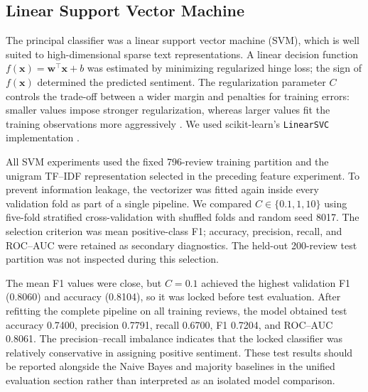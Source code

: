 \subsection{Linear Support Vector Machine}
\label{sec:linear-svm}

The principal classifier was a linear support vector machine (SVM), which is well suited to high-dimensional sparse text representations. A linear decision function $f(\mathbf{x})=\mathbf{w}^{\top}\mathbf{x}+b$ was estimated by minimizing regularized hinge loss; the sign of $f(\mathbf{x})$ determined the predicted sentiment. The regularization parameter $C$ controls the trade-off between a wider margin and penalties for training errors: smaller values impose stronger regularization, whereas larger values fit the training observations more aggressively \citep{cortes1995support}. We used scikit-learn's \texttt{LinearSVC} implementation \citep{pedregosa2011scikit}.

All SVM experiments used the fixed 796-review training partition and the unigram TF--IDF representation selected in the preceding feature experiment. To prevent information leakage, the vectorizer was fitted again inside every validation fold as part of a single pipeline. We compared $C\in\{0.1,1,10\}$ using five-fold stratified cross-validation with shuffled folds and random seed 8017. The selection criterion was mean positive-class F1; accuracy, precision, recall, and ROC--AUC were retained as secondary diagnostics. The held-out 200-review test partition was not inspected during this selection.

\begin{table}[t]
\centering
\caption{Training-only five-fold cross-validation for Linear SVM. Values are fold means; the selected setting is bold.}
\label{tab:svm-cv}
\small
{}
\end{table}

The mean F1 values were close, but $C=0.1$ achieved the highest validation F1 (0.8060) and accuracy (0.8104), so it was locked before test evaluation. After refitting the complete pipeline on all training reviews, the model obtained test accuracy 0.7400, precision 0.7791, recall 0.6700, F1 0.7204, and ROC--AUC 0.8061. The precision--recall imbalance indicates that the locked classifier was relatively conservative in assigning positive sentiment. These test results should be reported alongside the Naive Bayes and majority baselines in the unified evaluation section rather than interpreted as an isolated model comparison.

